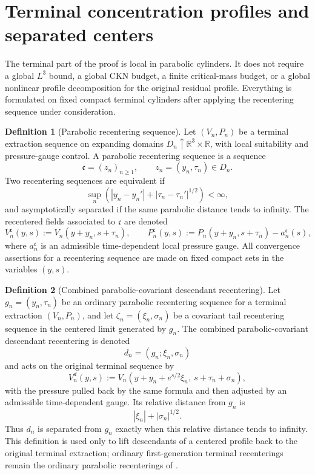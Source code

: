 \documentclass[11pt]{amsart}
\numberwithin{equation}{section}
\theoremstyle{plain}
\theoremstyle{definition}
\newtheorem{definition}[definition]{Definition}
\theoremstyle{remark}
\newcommand{\R}{\mathbb R}
\begin{document}
\section{Terminal concentration profiles and separated centers}
\label{sec:terminal-concentration}

The terminal part of the proof is local in parabolic cylinders.  It does not require a
global \(L^3\) bound, a global CKN budget, a finite critical-mass budget, or a
global nonlinear profile decomposition for the original residual profile.
Everything is formulated on fixed compact terminal cylinders after applying the
recentering sequence under consideration.

\begin{definition}[Parabolic recentering sequence]
\label{def:parabolic-recentering-sequence}
Let \((V_n,P_n)\) be a terminal extraction sequence on expanding domains
\(D_n\uparrow \R^3\times\R\), with local suitability and pressure-gauge
control.  A parabolic recentering sequence is a sequence
\[
   \mathfrak c=(z_n)_{n\ge1},\qquad z_n=(y_n,\tau_n)\in D_n .
\]
Two recentering sequences are equivalent if
\[
   \sup_n\left(|y_n-y_n'|+|\tau_n-\tau_n'|^{1/2}\right)<\infty,
\]
and asymptotically separated if the same parabolic distance tends to infinity.
The recentered fields associated to \(\mathfrak c\) are denoted
\[
   V_n^{\mathfrak c}(y,s):=V_n(y+y_n,s+\tau_n),
   \qquad
   P_n^{\mathfrak c}(y,s):=
   P_n(y+y_n,s+\tau_n)-a_n^{\mathfrak c}(s),
\]
where \(a_n^{\mathfrak c}\) is an admissible time-dependent local pressure
gauge.  All convergence assertions for a recentering sequence are made on fixed
compact sets in the variables \((y,s)\).
\end{definition}

\begin{definition}[Combined parabolic-covariant descendant recentering]
\label{def:combined-raw-covariant-recentering}
Let \(g_n=(y_n,\tau_n)\) be an ordinary parabolic recentering sequence for a terminal
extraction \((V_n,P_n)\), and let \(\zeta_n=(\xi_n,\sigma_n)\) be a covariant
tail recentering sequence in the centered limit generated by \(g_n\).  The
combined parabolic-covariant descendant recentering is denoted
\[
   d_n=(g_n;\xi_n,\sigma_n)
\]
and acts on the original terminal sequence by
\[
   V_n^{d}(y,s)
   :=
   V_n(y+y_n+e^{s/2}\xi_n,\ s+\tau_n+\sigma_n),
\]
with the pressure pulled back by the same formula and then adjusted by an
admissible time-dependent gauge.  Its relative distance from \(g_n\) is
\[
   |\xi_n|+|\sigma_n|^{1/2}.
\]
Thus \(d_n\) is separated from \(g_n\) exactly when this relative distance tends
to infinity.  This definition is used only to lift descendants of a centered
profile back to the original terminal extraction; ordinary first-generation
terminal recenterings remain the ordinary parabolic recenterings of
.
\end{definition}
\end{document}
